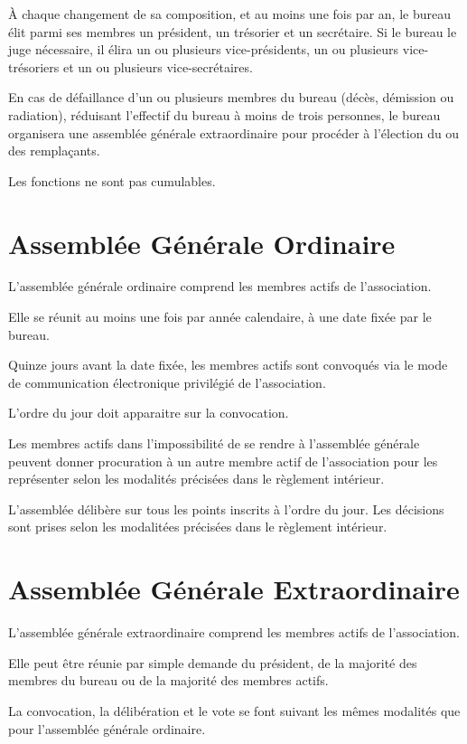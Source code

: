 \documentclass[a4paper, 11pt]{article}
\begin{document}
À chaque changement de sa composition, et au moins une fois par an, le bureau élit parmi ses membres un président, un
trésorier et un secrétaire.
Si le bureau le juge nécessaire, il élira un ou plusieurs vice-présidents, un ou plusieurs vice-trésoriers et un ou
plusieurs vice-secrétaires.


En cas de défaillance d'un ou plusieurs membres du bureau (décès, démission ou radiation), réduisant l'effectif du
bureau à moins de trois personnes, le bureau organisera une assemblée générale extraordinaire pour procéder à l'élection
du ou des remplaçants.

Les fonctions ne sont pas cumulables.


\section{Assemblée Générale Ordinaire} %

L'assemblée générale ordinaire comprend les membres actifs de l'association.

Elle se réunit au moins une fois par année calendaire, à une date fixée par le bureau.

Quinze jours avant la date fixée, les membres actifs sont convoqués via le mode
de communication électronique privilégié de l'association.

L'ordre du jour doit apparaitre sur la convocation.

Les membres actifs dans l'impossibilité de se rendre à l'assemblée générale peuvent donner procuration à un autre membre
actif de l'association pour les représenter selon les modalités précisées dans le règlement intérieur.

L'assemblée délibère sur tous les points inscrits à l'ordre du jour. Les décisions sont prises selon les modalitées
précisées dans le règlement intérieur.


\section{Assemblée Générale Extraordinaire} %

L'assemblée générale extraordinaire comprend les membres actifs de l'association.

Elle peut être réunie par simple demande du président, de la majorité des membres du bureau ou de la majorité des
membres actifs.

La convocation, la délibération et le vote se font suivant les mêmes modalités que pour l'assemblée générale ordinaire.
\end{document}
